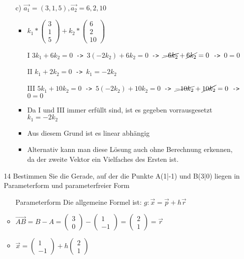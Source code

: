 \documentclass{article}
\begin{document}
\begin{itemize}
\begin{itemize}
\begin{itemize}
			\end{itemize}
			\item[c)]{$\vec{a_1}=(3,1,5), \vec{a_2}=6,2,10$}
			\begin{itemize}
				\item{$k_1*\begin{pmatrix} 3 \\ 1 \\ 5 \end{pmatrix}+k_2*\begin{pmatrix} 6 \\ 2 \\ 10 \end{pmatrix}$}
				\item[I]{$3k_1+6k_2=0$\texttt{ -> }$3(-2k_2)+6k_2=0$\texttt{ -> }$\cancel{-6k_2}+\cancel{6k_2}=0$\texttt{ -> }$0=0$}
				\item[II]{$k_1+2k_2=0$\texttt{ -> }$k_1=-2k_2$}
				\item[III]{$5k_1+10k_2=0$\texttt{ -> }$5(-2k_2)+10k_2=0$\texttt{ -> }$\cancel{-10k_2}+\cancel{10k_2}=0$\texttt{ -> }$0=0$}
				\item{Da I und III immer erfüllt sind, ist es gegeben vorrausgesetzt $k_1=-2k_2$}
				\item{Aus diesem Grund ist es linear abhängig}
				\item{Alternativ kann man diese Lösung auch ohne Berechnung erkennen, da der zweite Vektor ein Vielfaches des Ersten ist.}
			\end{itemize}
		\end{itemize}
		\item[14]{Bestimmen Sie die Gerade, auf der die Punkte A(1|-1) und B(3|0) liegen in Parameterform und parameterfreier Form}
		\begin{itemize}
			\item[Parameterform]{Die allgemeine Formel ist: $g:\vec{x}=\vec{p}+h \vec{r}$}
			\item{$\overrightarrow{AB}=B-A=\begin{pmatrix} 3 \\ 0 \end{pmatrix}-\begin{pmatrix} 1 \\ -1 \end{pmatrix}=\begin{pmatrix} 2 \\ 1  \end{pmatrix}=\vec{r}$}
			\item{$\vec{x}=\begin{pmatrix} 1 \\ -1 \end{pmatrix}+h \begin{pmatrix} 2 \\ 1 \end{pmatrix}$}

\end{itemize}
\end{itemize}
\end{document}
